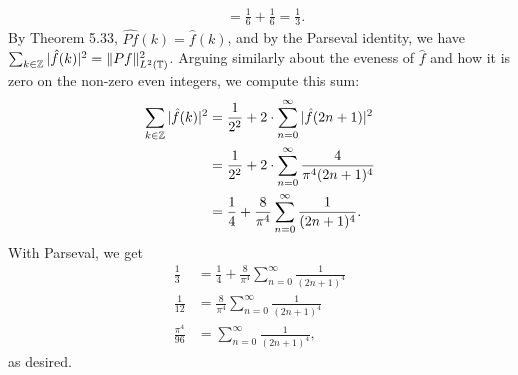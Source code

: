\documentclass[11pt]{article}
\begin{document}
\begin{enumerate}[leftmargin=2em, label=\arabic*.]
\begin{enumerate}
\begin{enumerate}
\begin{align*}
                        &= \frac{1}{6} + \frac{1}{6} = \frac{1}{3}
                    .\end{align*}
                    By Theorem 5.33, $\widehat{Pf}(k) = \hat{f}(k)$, and by the Parseval identity, we have $\sum_{k \in \mathbb{Z}} |\hat{f}(k)|^2 = \|Pf\|^2_{L^2(\mathbb{T})}$.
                    Arguing similarly about the eveness of $\hat{f}$ and how it is zero on the non-zero even integers, we compute this sum:
                    \begin{align*}
                        \sum_{k \in \mathbb{Z}} |\hat{f}(k)|^2 &= \frac{1}{2^2} + 2 \cdot \sum_{n = 0}^{\infty} |\hat{f}(2n + 1)|^2\\
                        &= \frac{1}{2^2} + 2\cdot \sum_{n= 0}^{\infty} \frac{4}{\pi^{4}(2n + 1)^{4}}  \\
                        &= \frac{1}{4} + \frac{8}{\pi^{4}} \sum_{n = 0}^{\infty} \frac{1}{(2n + 1)^{4}}
                    .\end{align*}
                    With Parseval, we get
                    \begin{align*}
                        \frac{1}{3} &= \frac{1}{4} + \frac{8}{\pi^4} \sum_{n= 0}^{\infty} \frac{1}{(2n + 1)^{4}}\\
                \frac{1}{12} &= \frac{8}{\pi^4} \sum_{n =0}^{\infty} \frac{1}{(2n + 1)^{4}}\\
                \frac{\pi^{4}}{96} &= \sum_{n =0}^{\infty} \frac{1}{(2n + 1)^{4}}
                    ,\end{align*}
                    as desired.
            \end{enumerate}
    \end{enumerate}

\end{enumerate}
\end{document}
